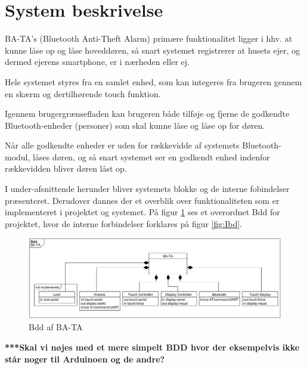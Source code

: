\graphicspath{{Chapters/System/}}


\section{System beskrivelse}

BA-TA's (Bluetooth Anti-Theft Alarm) primære funktionalitet ligger i hhv. at kunne låse op og låse hoveddøren, så snart systemet registrerer at husets ejer, og dermed ejerens smartphone, er i nærheden eller ej.

Hele systemet styres fra en samlet enhed, som kan integeres fra brugeren gennem en skærm og dertilhørende touch funktion. 

Igennem brugergrænsefladen kan brugeren både tilføje og fjerne de godkendte Bluetooth-enheder (personer) som skal kunne låse og låse op for døren.

Når alle godkendte enheder er uden for rækkevidde af systemets Bluetooth-modul, låses døren, og så snart systemet ser en godkendt enhed indenfor rækkevidden bliver døren låst op. 

I under-afsnittende herunder bliver systemets blokke og de interne fobindelser præsenteret. Derudover dannes der et overblik over funktionaliteten som er implementeret i projektet og systemet. 
På figur \ref{fig:Bdd} ses et overordnet Bdd for projektet, hvor de interne forbindelser forklares på figur \ref{fig:Ibd}. 

\begin{figure}[H]
	\centering
	\includegraphics[width = 500 pt]{Img/Bdd.png}
	\caption{Bdd af BA-TA}
	\label{fig:Bdd}
\end{figure}

\textbf{***Skal vi nøjes med et mere simpelt BDD hvor der eksempelvis ikke står noger til Arduinoen og de andre?}

